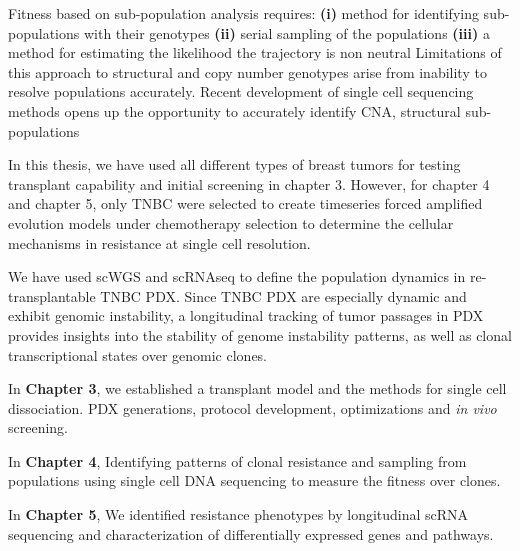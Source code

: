 Fitness based on sub-population analysis requires:
\textbf{(i)} method for identifying sub-populations with their genotypes
\textbf{(ii)} serial sampling of the populations
\textbf{(iii)} a method for estimating the likelihood the trajectory is non neutral
Limitations of this approach to structural and copy number genotypes arise from inability to resolve populations accurately.
Recent development of single cell sequencing methods opens up the opportunity to accurately identify \ac{CNA}, structural sub-populations

In this thesis, we have used all different types of breast tumors for testing transplant capability and initial screening in chapter 3.  However, for chapter 4 and chapter 5, only \ac{TNBC} were selected to create timeseries forced amplified evolution models under chemotherapy selection to determine the cellular mechanisms in resistance  at single cell resolution.

 We have used \ac{scWGS} and \ac{scRNAseq} to define the population dynamics in re-transplantable TNBC PDX.
 Since TNBC PDX are especially dynamic and exhibit genomic instability, a longitudinal tracking of tumor passages in PDX provides insights into the stability of genome instability patterns, as well as clonal transcriptional states over genomic clones.
 
 In \textbf{Chapter 3}, we established a transplant model and the methods for single cell dissociation. PDX generations, protocol development, optimizations and \textit{in vivo} screening. 
 
 In \textbf{Chapter 4}, Identifying patterns of clonal resistance and sampling from populations using single cell DNA sequencing to measure the fitness over clones.
 
 In \textbf{Chapter 5}, We identified resistance phenotypes by longitudinal scRNA sequencing and characterization of differentially  expressed genes and pathways.


